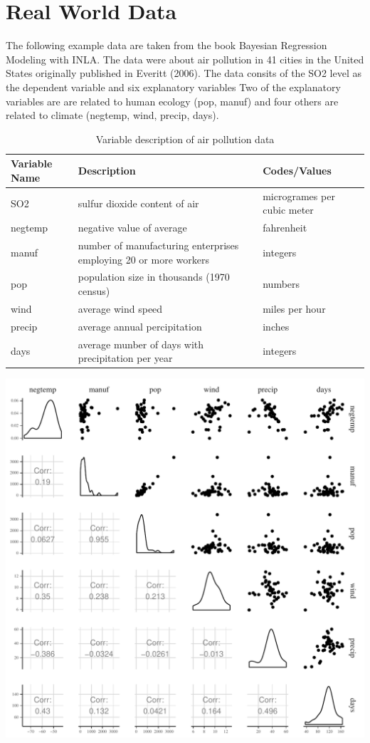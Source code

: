 \documentclass[11pt,a4paper,twoside]{book}
\makeatletter
\def\maxwidth{ %
  \ifdim\Gin@nat@width>\linewidth
    \linewidth
  \else
    \Gin@nat@width
  \fi
}
\makeatother
\begin{document}
\section{Real World Data}


The following example data are taken from the book Bayesian Regression Modeling with INLA. The data were about air pollution in 41 cities in the United States originally published in Everitt (2006). The data consits of the SO2 level as the dependent variable and six explanatory variables 
Two of the explanatory variables are are related to human ecology (pop, manuf) and four others are related to climate (negtemp, wind, precip, days).


\begin{table}
\caption{Variable description of air pollution data}
\begin{tabularx}{\textwidth}{|l|X|l|}
  \hline			
  Variable Name & Description & Codes/Values \\   \hline  
  SO2 & sulfur dioxide content of air & microgrames per cubic meter \\
  negtemp & negative value of average & fahrenheit\\
  manuf & number of manufacturing enterprises employing 20 or more workers & integers \\
  pop & population size in thousands (1970 census) & numbers \\
  wind & average wind speed & miles per hour \\
  precip & average annual percipitation & inches \\
  days & average munber of days with precipitation per year & integers \\
  \hline  
\end{tabularx}
\label{table:airpollutiondata}
\end{table}


\includegraphics[width=\maxwidth]{figure/ch03_figunnamed-chunk-1-1} 
\end{document}
